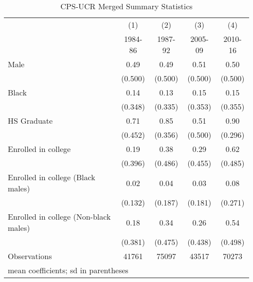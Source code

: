 \begin{table}[htbp]\centering
\caption{CPS-UCR Merged Summary Statistics}
\begin{tabular}{l*{4}{c}}
\hline\hline
                    &\multicolumn{1}{c}{(1)}&\multicolumn{1}{c}{(2)}&\multicolumn{1}{c}{(3)}&\multicolumn{1}{c}{(4)}\\
                    &\multicolumn{1}{c}{1984-86}&\multicolumn{1}{c}{1987-92}&\multicolumn{1}{c}{2005-09}&\multicolumn{1}{c}{2010-16}\\
\hline
Male                &        0.49&        0.49&        0.51&        0.50\\
                    &     (0.500)&     (0.500)&     (0.500)&     (0.500)\\
[1em]
Black               &        0.14&        0.13&        0.15&        0.15\\
                    &     (0.348)&     (0.335)&     (0.353)&     (0.355)\\
[1em]
HS Graduate         &        0.71&        0.85&        0.51&        0.90\\
                    &     (0.452)&     (0.356)&     (0.500)&     (0.296)\\
[1em]
Enrolled in college &        0.19&        0.38&        0.29&        0.62\\
                    &     (0.396)&     (0.486)&     (0.455)&     (0.485)\\
[1em]
Enrolled in college (Black males)&        0.02&        0.04&        0.03&        0.08\\
                    &     (0.132)&     (0.187)&     (0.181)&     (0.271)\\
[1em]
Enrolled in college (Non-black males)&        0.18&        0.34&        0.26&        0.54\\
                    &     (0.381)&     (0.475)&     (0.438)&     (0.498)\\
\hline
Observations        &       41761&       75097&       43517&       70273\\
\hline\hline
\multicolumn{5}{l}{\footnotesize mean coefficients; sd in parentheses}\\
\end{tabular}
\end{table}
